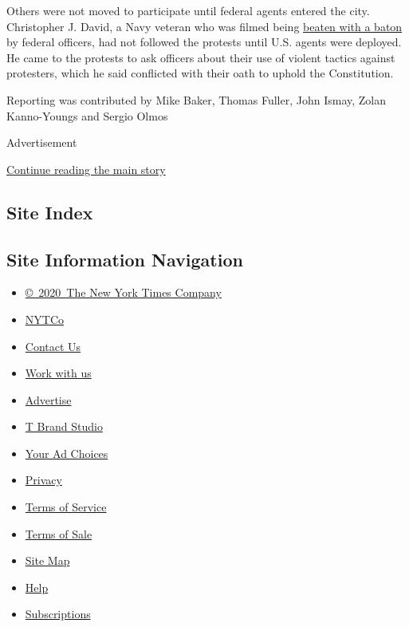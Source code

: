 Others were not moved to participate until federal agents entered the
city. Christopher J. David, a Navy veteran who was filmed being
\href{https://www.nytimes.com/2020/07/20/us/portland-protests-navy-christopher-david.html}{beaten
with a baton} by federal officers, had not followed the protests until
U.S. agents were deployed. He came to the protests to ask officers about
their use of violent tactics against protesters, which he said
conflicted with their oath to uphold the Constitution.

Reporting was contributed by Mike Baker, Thomas Fuller, John Ismay,
Zolan Kanno-Youngs and Sergio Olmos

Advertisement

\protect\hyperlink{after-bottom}{Continue reading the main story}

\hypertarget{site-index}{%
\subsection{Site Index}\label{site-index}}

\hypertarget{site-information-navigation}{%
\subsection{Site Information
Navigation}\label{site-information-navigation}}

\begin{itemize}
\tightlist
\item
  \href{https://help.nytimes.com/hc/en-us/articles/115014792127-Copyright-notice}{©~2020~The
  New York Times Company}
\end{itemize}

\begin{itemize}
\tightlist
\item
  \href{https://www.nytco.com/}{NYTCo}
\item
  \href{https://help.nytimes.com/hc/en-us/articles/115015385887-Contact-Us}{Contact
  Us}
\item
  \href{https://www.nytco.com/careers/}{Work with us}
\item
  \href{https://nytmediakit.com/}{Advertise}
\item
  \href{http://www.tbrandstudio.com/}{T Brand Studio}
\item
  \href{https://www.nytimes.com/privacy/cookie-policy\#how-do-i-manage-trackers}{Your
  Ad Choices}
\item
  \href{https://www.nytimes.com/privacy}{Privacy}
\item
  \href{https://help.nytimes.com/hc/en-us/articles/115014893428-Terms-of-service}{Terms
  of Service}
\item
  \href{https://help.nytimes.com/hc/en-us/articles/115014893968-Terms-of-sale}{Terms
  of Sale}
\item
  \href{https://spiderbites.nytimes.com}{Site Map}
\item
  \href{https://help.nytimes.com/hc/en-us}{Help}
\item
  \href{https://www.nytimes.com/subscription?campaignId=37WXW}{Subscriptions}
\end{itemize}
